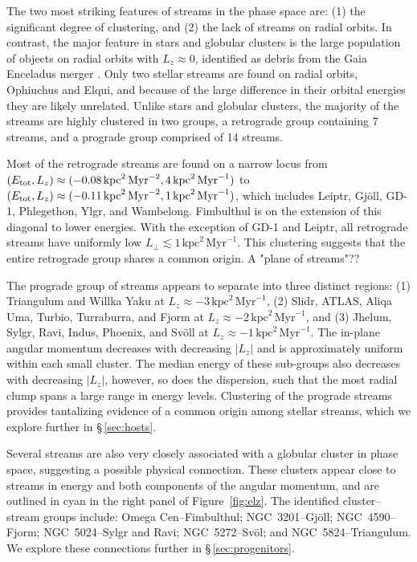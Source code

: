 \documentclass[twocolumn]{aastex63}
\newcommand{\ul}{\ensuremath{\textrm{kpc}^2\,\textrm{Myr}^{-1}}}
\newcommand{\ue}{\ensuremath{\textrm{kpc}^2\,\textrm{Myr}^{-2}}}
\begin{document}
The two most striking features of streams in the phase space are: (1) the significant degree of clustering, and (2) the lack of streams on radial orbits.
In contrast, the major feature in stars and globular clusters is the large population of objects on radial orbits with $L_z\approx0$, identified as debris from the Gaia Enceladus merger \citep[e.g.,][]{belokurov2018, helmi2018, naidu2020}.
Only two stellar streams are found on radial orbits, Ophiuchus and Elqui, and because of the large difference in their orbital energies they are likely unrelated.
Unlike stars and globular clusters, the majority of the streams are highly clustered in two groups, a retrograde group containing 7 streams, and a prograde group comprised of 14 streams.

Most of the retrograde streams are found on a narrow locus from $(E_{\rm tot}, L_z)\approx(-0.08\,\ue,\allowbreak 4\,\ul)$ to $(E_{\rm tot}, L_z)\approx(-0.11\,\ue,\allowbreak 1\,\ul)$, which includes Leiptr, Gj\" oll, GD-1, Phlegethon, Ylgr, and Wambelong.
Fimbulthul is on the extension of this diagonal to lower energies.
With the exception of GD-1 and Leiptr, all retrograde streams have uniformly low $L_\perp\lesssim1\,\ul$.
This clustering suggests that the entire retrograde group shares a common origin.  {\color{red} A "plane of streams"??}

The prograde group of streams appears to separate into three distinct regions: (1) Triangulum and Willka Yaku at $L_z\approx-3\,\ul$, (2) Slidr, ATLAS, Aliqa Uma, Turbio, Turraburra, and Fjorm at $L_z\approx-2\,\ul$, and (3) Jhelum, Sylgr, Ravi, Indus, Phoenix, and Sv\" oll at $L_z\approx-1\,\ul$.
The in-plane angular momentum decreases with decreasing $|L_z|$ and is approximately uniform within each small cluster.
The median energy of these sub-groups also decreases with decreasing $|L_z|$, however, so does the dispersion, such that the most radial clump spans a large range in energy levels.
Clustering of the prograde streams  provides tantalizing evidence of a common origin among stellar streams, which we explore further in \S\,\ref{sec:hosts}.

Several streams are also very closely associated with a globular cluster in phase space, suggesting a possible physical connection.
These clusters appear close to streams in energy and both components of the angular momentum, and are outlined in cyan in the right panel of Figure~\ref{fig:elz}.
The identified cluster--stream groups include: Omega Cen--Fimbulthul; NGC~3201--Gj\" oll; NGC~4590--Fjorm; NGC~5024--Sylgr and Ravi; NGC~5272--Sv\" ol; and NGC~5824--Triangulum.
We explore these connections further in \S\,\ref{sec:progenitors}.
\end{document}
